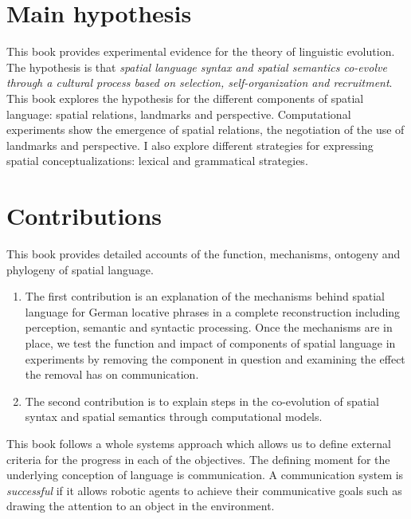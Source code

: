 \section{Main hypothesis}
\label{s:intro-main-hypothesis}
This book provides experimental evidence for the theory of linguistic
evolution. The hypothesis is that \emph{spatial language syntax and 
spatial semantics co-evolve through a cultural process based on selection, 
self-organization and recruitment}. This book explores the hypothesis for 
the different components of spatial language: spatial relations, landmarks 
and perspective. Computational experiments
show the emergence of spatial relations, the negotiation of the use of landmarks
and perspective. I also explore different strategies for expressing
spatial conceptualizations: lexical and grammatical strategies.

\section{Contributions}
\label{s:intro-objectives}
This book provides detailed accounts of 
the function, mechanisms, ontogeny and phylogeny of spatial language. 
\begin{enumerate}
\item The first contribution is an explanation of the mechanisms behind spatial language
for German locative phrases in a complete reconstruction including
perception, semantic and syntactic processing. Once the mechanisms are in place,
we test the function and impact of components of spatial language in experiments
by removing the component in question and examining the effect the removal has
on communication.
\item The second contribution is to explain steps in the co-evolution of spatial 
syntax and spatial semantics through computational models.
\end{enumerate}

This book follows a whole systems approach which allows us to define external 
criteria for the progress in each of the objectives. The defining moment for the 
underlying conception of language is communication. A communication system 
is \emph{successful} if it allows robotic agents to achieve 
their communicative goals such as drawing the attention to an object in the environment. 

